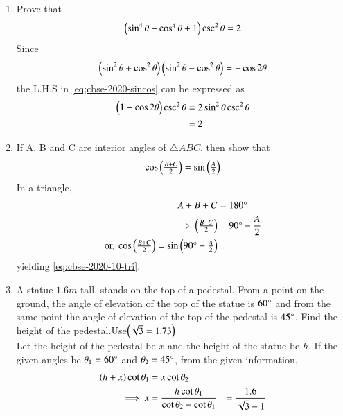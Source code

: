 \documentclass[journal,12pt,twocolumn]{IEEEtran}
\renewcommand\thesection{\arabic{section}}
\begin{document}
\begin{enumerate}[label=\thesection.\arabic*.,ref=\thesection.\theenumi]
    \item Prove that
	    \begin{align}
		    \label{eq;cbse-2020-sincos}
    \begin{pmatrix}\sin^4\theta  - \cos^4\theta + 1\end{pmatrix} \csc^2\theta = 2
		    \end{align}
    \solution Since 
	    \begin{align}
\left(\sin^2\theta  + \cos^2\theta \right)
\left(\sin^2\theta  - \cos^2\theta \right)
= -\cos 2 \theta
		    \end{align}
		    the L.H.S in 
		    \eqref{eq;cbse-2020-sincos}
		    can be expressed as 
	    \begin{align}
		    \label{eq;cbse-2020-sincos_simp}
		    \begin{pmatrix}1-\cos2\theta\end{pmatrix} \csc^2\theta &= 
2 \sin^2 \theta \csc^2\theta 
\\
		    &= 2
		    \end{align}
    
      
     
    
    
    \item If A, B and C are interior angles of $\triangle ABC$, then show that
		    \begin{align}
			    \label{eq:cbse-2020-10-tri}
    \cos \begin{pmatrix}\frac{B + C}{2}\end{pmatrix} = \sin \begin{pmatrix}\frac{A}{2}\end{pmatrix}
		    \end{align}
		    \solution In a triangle,
		    \begin{align}
			    A+B+C &= 180\degree
			    \\
			    \implies \begin{pmatrix}\frac{B + C}{2}\end{pmatrix} &= 90\degree-\frac{A}{2}
			    \\
			    \text{or, }    \cos \begin{pmatrix}\frac{B + C}{2}\end{pmatrix} = \sin \begin{pmatrix}90\degree -\frac{A}{2}\end{pmatrix}
		    \end{align}
			    yielding \eqref{eq:cbse-2020-10-tri}.

    \item A statue $1.6m$ tall, stands on the top of a pedestal. From a point on the ground,  the angle of elevation of the top of the statue is $60\degree$ and from the same point the angle of elevation of the top of the pedestal is $45\degree$. Find the height of the pedestal.Use$\begin{pmatrix}\sqrt{3} = 1.73\end{pmatrix}$\\
	    \solution Let the height of the pedestal be $x$ and the height of the statue be $h$. If the given angles be $\theta_1 = 60 \degree$ and $\theta_2 = 45 \degree$,  from the given information, 
\begin{align}
	\left(h + x \right)\cot \theta_1 &= x \cot \theta_2
	\\
	\implies x &= \frac{h\cot \theta_1}{\cot \theta_2-\cot \theta_1}
	&= \frac{1.6}{\sqrt{3}-1}
\end{align}
	    

    
    \end{enumerate}
\end{document}
